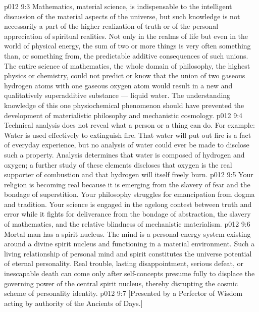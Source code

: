 \vs p012 9:3 Mathematics, material science, is indispensable to the intelligent discussion of the material aspects of the universe, but such knowledge is not necessarily a part of the higher realization of truth or of the personal appreciation of spiritual realities. Not only in the realms of life but even in the world of physical energy, the sum of two or more things is very often something  than, or something  from, the predictable additive consequences of such unions. The entire science of mathematics, the whole domain of philosophy, the highest physics or chemistry, could not predict or know that the union of two gaseous hydrogen atoms with one gaseous oxygen atom would result in a new and qualitatively superadditive substance --- liquid water. The understanding knowledge of this one physiochemical phenomenon should have prevented the development of materialistic philosophy and mechanistic cosmology.
\vs p012 9:4 Technical analysis does not reveal what a person or a thing can do. For example: Water is used effectively to extinguish fire. That water will put out fire is a fact of everyday experience, but no analysis of water could ever be made to disclose such a property. Analysis determines that water is composed of hydrogen and oxygen; a further study of these elements discloses that oxygen is the real supporter of combustion and that hydrogen will itself freely burn.
\vs p012 9:5 Your religion is becoming real because it is emerging from the slavery of fear and the bondage of superstition. Your philosophy struggles for emancipation from dogma and tradition. Your science is engaged in the agelong contest between truth and error while it fights for deliverance from the bondage of abstraction, the slavery of mathematics, and the relative blindness of mechanistic materialism.
\vs p012 9:6 \pc Mortal man has a spirit nucleus. The mind is a personal\hyp{}energy system existing around a divine spirit nucleus and functioning in a material environment. Such a living relationship of personal mind and spirit constitutes the universe potential of eternal personality. Real trouble, lasting disappointment, serious defeat, or inescapable death can come only after self\hyp{}concepts presume fully to displace the governing power of the central spirit nucleus, thereby disrupting the cosmic scheme of personality identity.
\vsetoff
\vs p012 9:7 [Presented by a Perfector of Wisdom acting by authority of the Ancients of Days.]
\quizlink
